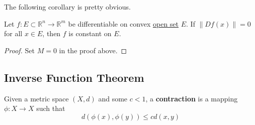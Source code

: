	The following corollary is pretty obvious. 

	\begin{corollary}
	  \label{thm:vanishing-derivative-implies-constant}
		Let $f: E \subset \mathbb{R}^n \to \mathbb{R}^m$ be differentiable on convex \hyperref[pst-def:open-set]{open set} $E$. If $\|Df(x)\| = 0$ for all $x \in E$, then $f$ is constant on $E$. 
	\end{corollary}
	\begin{proof}
	  Set $M = 0$ in the proof above. 
	\end{proof}

\subsection{Inverse Function Theorem}

	\begin{definition}[Contraction]
	  \label{def:contraction}
	  Given a metric space $(X, d)$ and some $c < 1$, a \textbf{contraction} is a mapping $\phi: X \to X$ such that 
		\begin{equation}
		  d(\phi(x), \phi(y)) \leq c d(x, y)
		\end{equation}
	\end{definition}

